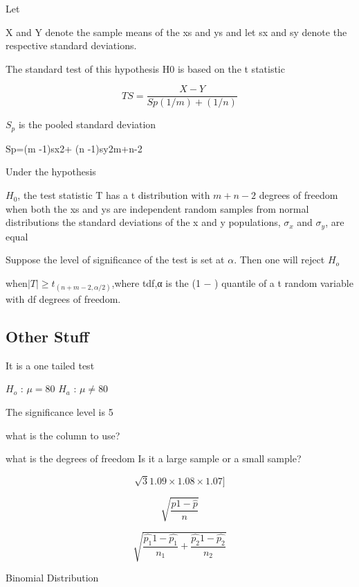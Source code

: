 \documentclass[]{report}
\begin{document}
{Let

X and Y denote the sample means of the xs and ys and let sx and sy
denote the respective standard deviations.

The standard test of this hypothesis
H0 is based on the t statistic

\[TS =\frac{X-Y}{Sp(1/m )+ (1/n)}\]


$S_p$ is the pooled standard deviation


Sp=(m -1)sx2+ (n -1)sy2m+n-2

Under the hypothesis

$H_0$, the test statistic T has a t distribution with $m+n−2$
degrees of freedom when both the xs and ys are independent random samples from normal distributions the standard deviations of the x and y populations, $\sigma_x$ and $\sigma_y$, are equal

Suppose the level of significance of the test is set at $\alpha$. Then one will reject $H_o$

when$|T| ≥ t_{(n+m−2,\alpha/2)}$,where tdf,α is the (1 − ) quantile of a t random variable with df degrees of
freedom.



















\subsection{Other Stuff}

It is a one tailed test

$H_o$  : $\mu = 80 $
$H_a$  : $\mu \neq 80$ 

The significance level is 5%

what is the column to use?

what is the degrees of freedom 
Is it a large sample or a small sample?



\[\sqrt{3}{1.09 \times 1.08 \times 1.07}]\]


\[\sqrt{ \frac{\hat{p} 1- \hat{p}}{n} }\]


\[\sqrt{ \frac{\hat{p_1} 1- \hat{p_1}}{n_1} + \frac{\hat{p_2} 1- \hat{p_2}}{n_2}}\]



Binomial Distribution

}
\end{document}
